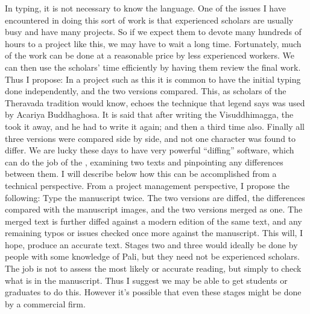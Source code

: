 {}In typing, it is not necessary to know the language. One of the issues I have encountered in doing this sort of work is that experienced scholars are usually busy and have many projects. So if we expect them to devote many hundreds of hours to a project like this, we may have to wait a long time. Fortunately, much of the work can be done at a reasonable price by less experienced workers. We can then use the scholars’ time efficiently by having them review the final work. Thus I propose:\markdownRendererInterblockSeparator
{}\markdownRendererBlockQuoteBegin
{}
\markdownRendererBlockQuoteEnd \markdownRendererInterblockSeparator
{}In a project such as this it is common to have the initial typing done  independently, and the two versions compared. This, as scholars of the Theravada tradition would know, echoes the technique that legend says was used by Acariya Buddhaghosa. It is said that after writing the Visuddhimagga, the  took it away, and he had to write it again; and then a third time also. Finally all three versions were compared side by side, and not one character was found to differ.\markdownRendererInterblockSeparator
{}We are lucky these days to have very powerful “diffing” software, which can do the job of the , examining two texts and pinpointing any differences between them. I will describe below how this can be accomplished from a technical perspective.\markdownRendererInterblockSeparator
{}From a project management perspective, I propose the following:\markdownRendererInterblockSeparator
{}\markdownRendererOlBeginTight
{}Type the manuscript twice.\markdownRendererOlItemEnd 
{}The two versions are diffed, the differences compared with the manuscript images, and the two versions merged as one.\markdownRendererOlItemEnd 
{}The merged text is further diffed against a modern edition of the same text, and any remaining typos or issues checked once more against the manuscript.\markdownRendererOlItemEnd 
\markdownRendererOlEndTight \markdownRendererInterblockSeparator
{}This will, I hope, produce an accurate text. Stages two and three would ideally be done by people with some knowledge of Pali, but they need not be experienced scholars. The job is not to assess the most likely or accurate reading, but simply to check what is in the manuscript. Thus I suggest we may be able to get students or graduates to do this. However it’s possible that even these stages might be done by a commercial firm.\markdownRendererInterblockSeparator
